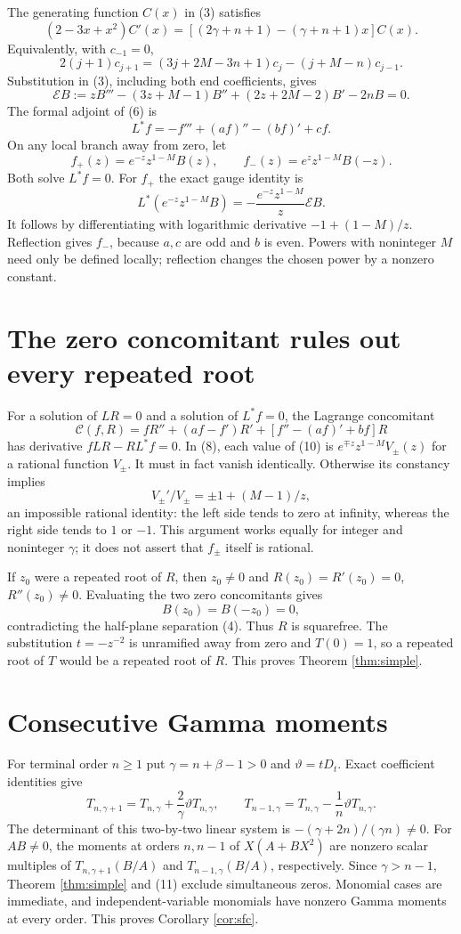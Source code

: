 \documentclass[11pt]{article}
\begin{document}
The generating function $C(x)$ in (3) satisfies
\[
 (2-3x+x^2)C'(x)=[(2\gamma+n+1)-(\gamma+n+1)x]C(x).
\]
Equivalently, with $c_{-1}=0$,
\[
 2(j+1)c_{j+1}=(3j+2M-3n+1)c_j-(j+M-n)c_{j-1}.
\]
Substitution in (3), including both end coefficients, gives
\[
 \mathcal EB:=zB'''-(3z+M-1)B''+(2z+2M-2)B'-2nB=0.            \tag{7}
\]
The formal adjoint of (6) is
\[
 L^*f=-f'''+(af)''-(bf)'+cf.
\]
On any local branch away from zero, let
\[
 f_+(z)=e^{-z}z^{1-M}B(z),\qquad
 f_-(z)=e^{z}z^{1-M}B(-z).                                    \tag{8}
\]
Both solve $L^*f=0$. For $f_+$ the exact gauge identity is
\[
 L^*(e^{-z}z^{1-M}B)=-\frac{e^{-z}z^{1-M}}z\mathcal EB.
                                                               \tag{9}
\]
It follows by differentiating with logarithmic derivative
$-1+(1-M)/z$. Reflection gives $f_-$, because $a,c$ are odd and $b$
is even. Powers with noninteger $M$ need only be defined locally;
reflection changes the chosen power by a nonzero constant.

\section{The zero concomitant rules out every repeated root}
For a solution of $LR=0$ and a solution of $L^*f=0$, the Lagrange
concomitant
\[
 \mathcal C(f,R)=fR''+(af-f')R'+[f''-(af)'+bf]R                \tag{10}
\]
has derivative $fLR-RL^*f=0$. In (8), each value of (10) is
$e^{\mp z}z^{1-M}V_\pm(z)$ for a rational function $V_\pm$.
It must in fact vanish identically. Otherwise its constancy implies
\[
 V_\pm'/V_\pm=\pm1+(M-1)/z,
\]
an impossible rational identity: the left side tends to zero at infinity,
whereas the right side tends to $1$ or $-1$. This argument works equally
for integer and noninteger $\gamma$; it does not assert that $f_\pm$
itself is rational.

If $z_0$ were a repeated root of $R$, then $z_0\ne0$ and
$R(z_0)=R'(z_0)=0$, $R''(z_0)\ne0$. Evaluating the two zero
concomitants gives
\[
 B(z_0)=B(-z_0)=0,
\]
contradicting the half-plane separation (4). Thus $R$ is squarefree.
The substitution $t=-z^{-2}$ is unramified away from zero and
$T(0)=1$, so a repeated root of $T$ would be a repeated root of $R$.
This proves Theorem \ref{thm:simple}.

\section{Consecutive Gamma moments}
For terminal order $n\ge1$ put $\gamma=n+\beta-1>0$ and
$\vartheta=tD_t$. Exact coefficient identities give
\[
 T_{n,\gamma+1}=T_{n,\gamma}+\frac2\gamma\vartheta T_{n,\gamma},
 \qquad
 T_{n-1,\gamma}=T_{n,\gamma}-\frac1n\vartheta T_{n,\gamma}.      \tag{11}
\]
The determinant of this two-by-two linear system is
$-(\gamma+2n)/(\gamma n)\ne0$.
For $AB\ne0$, the moments at orders $n,n-1$ of $X(A+BX^2)$ are
nonzero scalar multiples of $T_{n,\gamma+1}(B/A)$ and
$T_{n-1,\gamma}(B/A)$, respectively. Since $\gamma>n-1$, Theorem
\ref{thm:simple} and (11) exclude simultaneous zeros. Monomial cases
are immediate, and independent-variable monomials have nonzero Gamma
moments at every order. This proves Corollary \ref{cor:sfc}.
\end{document}
